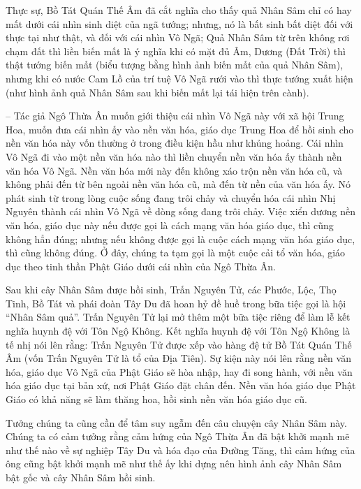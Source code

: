 Thực sự, Bồ Tát Quán Thế Âm đã cắt nghĩa cho thấy quả Nhân Sâm chỉ có hay mất dưới cái nhìn sinh diệt của ngã tướng; nhưng, nó là bất sinh bất diệt đối với thực tại như thật, và đối với cái nhìn Vô Ngã; Quả Nhân Sâm từ trên không rơi chạm đất thì liền biến mất là ý nghĩa khi có mặt đủ Âm, Dương (Đất Trời) thì thật tướng biến mất (biểu tượng bằng hình ảnh biến mất của quả Nhân Sâm), nhưng khi có nước Cam Lồ của trí tuệ Vô Ngã rưới vào thì thực tướng xuất hiện (như hình ảnh quả Nhân Sâm sau khi biến mất lại tái hiện trên cành).

-- Tác giả Ngô Thừa Ân muốn giới thiệu cái nhìn Vô Ngã này với xã hội Trung Hoa, muốn đưa cái nhìn ấy vào nền văn hóa, giáo dục Trung Hoa để hồi sinh cho nền văn hóa này vốn thường ở trong điều kiện hầu như khủng hoảng. Cái nhìn Vô Ngã đi vào một nền văn hóa nào thì liền chuyển nền văn hóa ấy thành nền văn hóa Vô Ngã. Nền văn hóa mới này đến không xáo trộn nền văn hóa cũ, và không phải đến từ bên ngoài nền văn hóa cũ, mà đến từ nền của văn hóa ấy. Nó phát sinh từ trong lòng cuộc sống đang trôi chảy và chuyển hóa cái nhìn Nhị Nguyên thành cái nhìn Vô Ngã về dòng sống đang trôi chảy. Việc xiển dương nền văn hóa, giáo dục này nếu được gọi là cách mạng văn hóa giáo dục, thì cũng không hẳn đúng; nhưng nếu không được gọi là cuộc cách mạng văn hóa giáo dục, thì cũng không đúng. Ở đây, chúng ta tạm gọi là một cuộc cải tổ văn hóa, giáo dục theo tinh thần Phật Giáo dưới cái nhìn của Ngô Thừa Ân.

Sau khi cây Nhân Sâm được hồi sinh, Trấn Nguyên Tử, các Phước, Lộc, Thọ Tinh, Bồ Tát và phái đoàn Tây Du đã hoan hỷ đề huề trong bữa tiệc gọi là hội ``Nhân Sâm quả''. Trấn Nguyên Tử lại mở thêm một bữa tiệc riêng để làm lễ kết nghĩa huynh đệ với Tôn Ngộ Không. Kết nghĩa huynh đệ với Tôn Ngộ Không là tế nhị nói lên rằng: Trấn Nguyên Tử được xếp vào hàng đệ tử Bồ Tát Quán Thế Âm (vốn Trấn Nguyên Tử là tổ của Địa Tiên). Sự kiện này nói lên rằng nền văn hóa, giáo dục Vô Ngã của Phật Giáo sẽ hòa nhập, hay đi song hành, với nền văn hóa giáo dục tại bản xứ, nơi Phật Giáo đặt chân đến. Nền văn hóa giáo dục Phật Giáo có khả năng sẽ làm thăng hoa, hồi sinh nền văn hóa giáo dục cũ.

Tưởng chúng ta cũng cần để tâm suy ngẫm đến câu chuyện cây Nhân Sâm này. Chúng ta có cảm tưởng rằng cảm hứng của Ngô Thừa Ân đã bật khởi mạnh mẽ như thế nào về sự nghiệp Tây Du và hóa đạo của Đường Tăng, thì cảm hứng của ông cũng bật khởi mạnh mẽ như thế ấy khi dựng nên hình ảnh cây Nhân Sâm bật gốc và cây Nhân Sâm hồi sinh.

